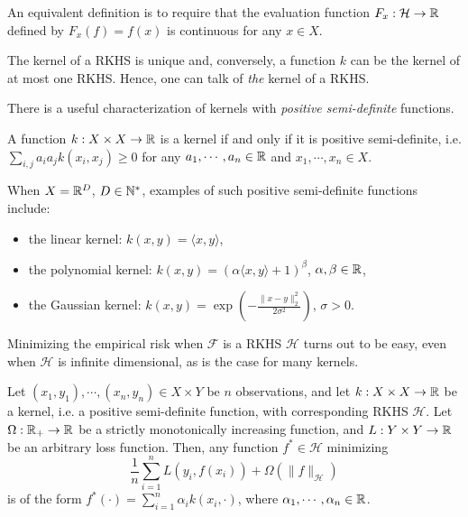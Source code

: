 An equivalent definition is to require that the evaluation function 
$F_x:\mathcal H\rightarrow\mathbb{R}$ defined by $F_x(f)=f(x)$ 
is continuous for any $x\in X$.


\begin{prop}
The kernel of a RKHS is unique and, conversely, a function $k$ can be the kernel of at most one RKHS.
Hence, one can talk of {\em the} kernel of a RKHS. 
\end{prop}



There is a useful characterization of kernels
with {\em positive semi-definite} functions.

\begin{thm} 
A function $k:X\times X\rightarrow\mathbb{R}$ is a kernel if and only if it is positive semi-definite,
i.e. $\sum_{i,j}a_ia_jk(x_i,x_j)\geq 0$ for any $a_1,\cdots,a_n\in\mathbb{R}$ and $x_1,\cdots,x_n\in X$.
\end{thm}

When $X=\mathbb{R}^D$, $D\in\mathbb{N}^*$, examples of such positive semi-definite functions include:
\begin{itemize}
\item the linear kernel: $k(x,y) = \langle x, y \rangle$,
\item the polynomial kernel: $k(x,y) = (\alpha \langle x, y \rangle + 1)^\beta$, $\alpha,\beta\in\mathbb{R}$,
\item the Gaussian kernel: $k(x,y) = \exp\left( -\frac{\|x-y\|_2^2}{2\sigma^2}\right)$, $\sigma >0$.
\end{itemize}


Minimizing the empirical risk when $\mathcal F$ is a RKHS $\mathcal H$ turns out to be easy, even when $\mathcal H$ is infinite dimensional,
as is the case for many kernels.

\begin{thm}
Let $(x_1,y_1),\cdots,(x_n,y_n)\in X\times Y$ be $n$ observations, and
let $k:X\times X\rightarrow\mathbb{R}$ be a kernel, i.e. a positive semi-definite function,
with corresponding RKHS $\mathcal H$.
Let $\Omega:\mathbb{R}_+\rightarrow\mathbb{R}$ be a strictly monotonically increasing function,
and $L:Y\times Y\rightarrow\mathbb{R}$ be an arbitrary loss function.
Then, any function $f^*\in\mathcal H$ minimizing
$$\frac 1n \sum_{i=1}^n L(y_i,f(x_i)) + \Omega(\|f\|_{\mathcal H})$$
is of the form $f^*(\cdot)=\sum_{i=1}^n \alpha_i k(x_i,\cdot)$, where $\alpha_1,\cdots,\alpha_n\in\mathbb{R}$.
\end{thm} 


